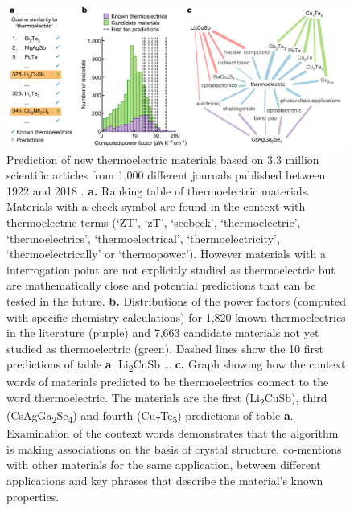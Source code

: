 \begin{figure}[]
	\centering
	\includegraphics[width=1.0\textwidth]{imgs/Tshitoyan2019_Material_Predictions_01}
	\caption{Prediction of new thermoelectric materials based on 3.3 million scientific articles from 1,000 different journals published between 1922 and 2018 \citep{Tshitoyan2019}. 
		\newline
		\textbf{a.} Ranking table of thermoelectric materials. Materials with a check symbol are found in the context with thermoelectric terms (\ie ‘ZT’, ‘zT’, ‘seebeck’, ‘thermoelectric’, ‘thermoelectrics’, ‘thermoelectrical’, ‘thermoelectricity’, ‘thermoelectrically’ or ‘thermopower’). However materials with a interrogation point are not explicitly studied as thermoelectric but are \doq mathematically\deq{} close and potential predictions that can be tested in the future.
		\newline
		\textbf{b.} Distributions of the power factors (computed with specific chemistry calculations) for 1,820 known thermoelectrics in the literature (purple) and 7,663 candidate materials not yet studied as thermoelectric (green). Dashed lines show the 10 first predictions of table \textbf{a}: Li\textsubscript{2}CuSb \ldots
		\newline
		\textbf{c.} Graph showing how the context words of materials predicted to be thermoelectrics connect to the word thermoelectric. The materials are the first (Li\textsubscript{2}CuSb), third (CsAgGa\textsubscript{2}Se\textsubscript{4}) and fourth (Cu\textsubscript{7}Te\textsubscript{5}) predictions of table \textbf{a}. Examination of the context words demonstrates that the algorithm is making associations on the basis of crystal structure, co-mentions with other materials for the same application, between different applications and key phrases that describe the material’s known properties.
	}
	\label{MaterialPrediction01}
\end{figure}

